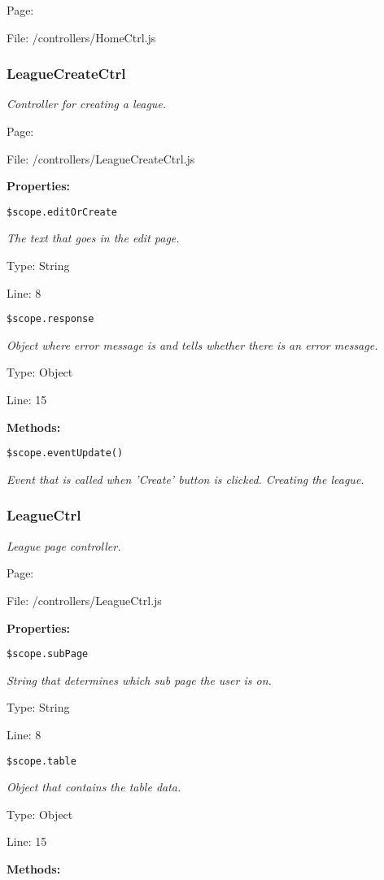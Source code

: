 Page: \pageref{HomeCtrl.js}

File: /controllers/HomeCtrl.js

\subsubsection{LeagueCreateCtrl}\label{LeagueCreateCtrl.js.doc}
\textit{Controller for creating a league.}

Page: \pageref{LeagueCreateCtrl.js}

File: /controllers/LeagueCreateCtrl.js

\textbf{Properties:}

\texttt{\$scope.editOrCreate}

{\scriptsize
\textit{The text that goes in the edit page.}

Type: String

Line: 8

}
\texttt{\$scope.response}

{\scriptsize
\textit{Object where error message is and tells whether there is an error message.}

Type: Object

Line: 15

}
\textbf{Methods:}

\texttt{\$scope.eventUpdate()}

{\scriptsize
\textit{Event that is called when 'Create' button is clicked.
Creating the league.}

}

\subsubsection{LeagueCtrl}\label{LeagueCtrl.js.doc}
\textit{League page controller.}

Page: \pageref{LeagueCtrl.js}

File: /controllers/LeagueCtrl.js

\textbf{Properties:}

\texttt{\$scope.subPage}

{\scriptsize
\textit{String that determines which sub page the user is on.}

Type: String

Line: 8

}
\texttt{\$scope.table}

{\scriptsize
\textit{Object that contains the table data.}

Type: Object

Line: 15

}
\textbf{Methods:}

